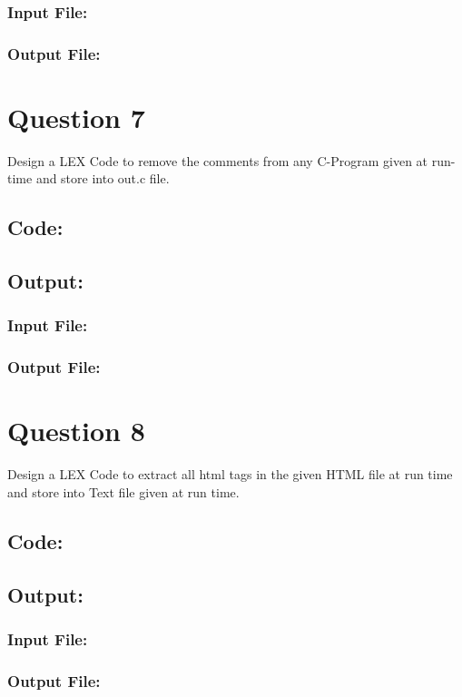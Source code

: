 \documentclass{article}
\begin{document}
\subsubsection*{Input File:}

\subsubsection*{Output File:}


\newpage
\section*{Question 7}
Design a LEX Code to remove the comments from any C-Program
 given at run-time and store into out.c file.
\subsection*{Code:}

\newpage
\subsection*{Output:}
\subsubsection*{Input File:}

\subsubsection*{Output File:}


\newpage
\section*{Question 8}
Design a LEX Code to extract all html tags in the given HTML file 
at run time and store into Text file given at run time.
\subsection*{Code:}

\newpage
\subsection*{Output:}
\subsubsection*{Input File:}

\subsubsection*{Output File:}

\end{document}
